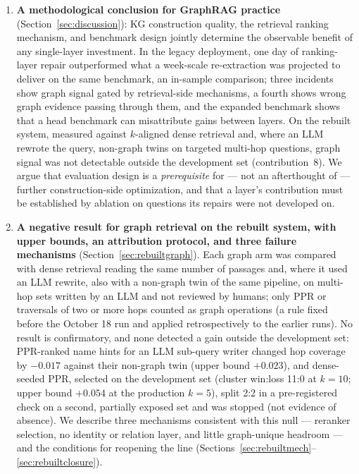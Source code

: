\begin{enumerate}
\item \textbf{A methodological conclusion for GraphRAG practice}
(Section~\ref{sec:discussion}): KG construction quality, the retrieval
ranking mechanism, and benchmark design jointly determine the observable
benefit of any single-layer investment. In the legacy deployment, one day
of ranking-layer repair outperformed what a week-scale re-extraction was
projected to deliver on the same benchmark, an in-sample comparison;
three incidents show graph signal gated by retrieval-side mechanisms, a
fourth shows wrong graph evidence passing through them, and the expanded
benchmark shows that a head benchmark can misattribute gains between
layers. On the rebuilt system, measured against $k$-aligned dense retrieval and, where an LLM rewrote the query, non-graph twins on targeted multi-hop questions, graph signal was not detectable outside the development set (contribution~8). We
argue that evaluation design is a \emph{prerequisite} for --- not an
afterthought of --- further construction-side optimization, and that a
layer's contribution must be established by ablation on questions its
repairs were not developed on.

\item \textbf{A negative result for graph retrieval on the rebuilt
system, with upper bounds, an attribution protocol, and three failure
mechanisms} (Section~\ref{sec:rebuiltgraph}). Each graph arm was
compared with dense retrieval reading the same number of passages and,
where it used an LLM rewrite, also with a non-graph twin of the same
pipeline, on multi-hop sets written by an LLM and not reviewed by
humans; only PPR or traversals of two or more hops counted as graph
operations (a rule fixed before the October 18 run and applied
retrospectively to the earlier runs). No result is confirmatory, and
none detected a gain outside the development set: PPR-ranked name hints
for an LLM sub-query writer changed hop coverage by $-0.017$ against
their non-graph twin (upper bound $+0.023$), and dense-seeded PPR,
selected on the development set (cluster win:loss 11:0 at $k=10$; upper
bound $+0.054$ at the production $k=5$), split 2:2 in a pre-registered
check on a second, partially exposed set and was stopped (not evidence
of absence). We describe three mechanisms consistent with this null ---
reranker selection, no identity or relation layer, and little
graph-unique headroom --- and the conditions for reopening the line
(Sections~\ref{sec:rebuiltmech}--\ref{sec:rebuiltclosure}).
\end{enumerate}


